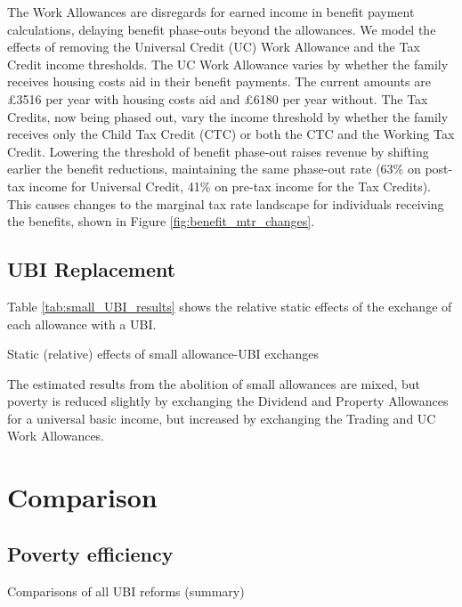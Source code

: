 \documentclass{article}
\begin{document}
    The Work Allowances are disregards for earned income in benefit payment calculations, delaying benefit phase-outs beyond the allowances. We model the effects of removing the Universal Credit (UC) Work Allowance and the Tax Credit income thresholds. The UC Work Allowance varies by whether the family receives housing costs aid in their benefit payments. The current amounts are £3516 per year with housing costs aid and £6180 per year without. The Tax Credits, now being phased out, vary the income threshold by whether the family receives only the Child Tax Credit (CTC) or both the CTC and the Working Tax Credit. Lowering the threshold of benefit phase-out raises revenue by shifting earlier the benefit reductions, maintaining the same phase-out rate (63\% on post-tax income for Universal Credit, 41\% on pre-tax income for the Tax Credits). This causes changes to the marginal tax rate landscape for individuals receiving the benefits, shown in Figure \ref{fig:benefit_mtr_changes}. 
    
    \subsection{UBI Replacement}

    Table \ref{tab:small_UBI_results} shows the relative static effects of the exchange of each allowance with a UBI.

    \begin{table}[h]
        \centering
        
        \caption{Static (relative) effects of small allowance-UBI exchanges}
        \label{tab:small_UBI_results}
    \end{table}
    The estimated results from the abolition of small allowances are mixed, but poverty is reduced slightly by exchanging the Dividend and Property Allowances for a universal basic income, but increased by exchanging the Trading and UC Work Allowances.

    \section{Comparison}

    \subsection{Poverty efficiency}

    \begin{table}[h]
        \centering
        
        \caption{Comparisons of all UBI reforms (summary)}
        \label{tab:comp_UBI_1}
    \end{table}
\end{document}
